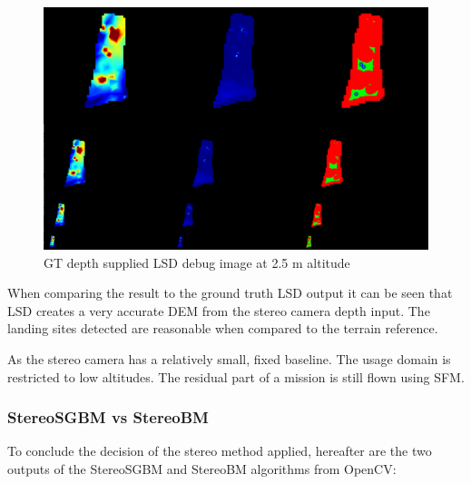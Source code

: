\clearpage %

\begin{figure}[ht!]
    \centering
    \includegraphics[scale=0.25]{images/preparation/GT_2.5m.png}
    \caption{GT depth supplied LSD debug image at 2.5 m altitude}
    \label{stereo_GT}
\end{figure}

When comparing the result to the ground truth LSD output it can be seen that LSD creates a very accurate DEM from the stereo camera depth input. The landing sites detected are reasonable when compared to the terrain reference. 

As the stereo camera has a relatively small, fixed baseline. The usage domain is restricted to low altitudes. The residual part of a mission is still flown using SFM. 

\subsubsection{StereoSGBM vs StereoBM}

To conclude the decision of the stereo method applied, hereafter are the two outputs of the StereoSGBM and StereoBM algorithms from OpenCV:



